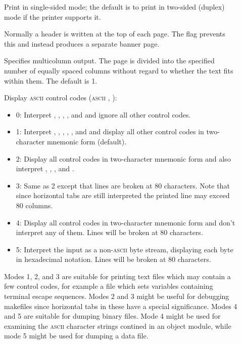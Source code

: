 \begin{description}
\item[]
   Print in single-sided mode; the default is to print in two-sided (duplex)
   mode if the printer supports it.

\item[]
   Normally a header is written at the top of each page.  The  flag
   prevents this and instead produces a separate banner page.

\item[\code{\#}]
   Specifies multicolumn output.  The page is divided into the specified
   number of equally spaced columns without regard to whether the text fits
   within them.  The default is 1.

\item[\code{\#}]
   Display \textsc{ascii} control codes (\textsc{ascii} ,
   ):

   \begin{itemize}
   \item
      0: Interpret , , , , and 
      and ignore all other control codes.

   \item
      1: Interpret , , , , , and
       and display all other control codes in two-character mnemonic
      form (default).

   \item
      2: Display all control codes in two-character mnemonic form and also
      interpret , , , and .

   \item
      3: Same as 2 except that lines are broken at 80 characters.  Note that
      since horizontal tabs are still interpreted the printed line may exceed
      80 columns.

   \item
      4: Display all control codes in two-character mnemonic form and don't
      interpret any of them.  Lines will be broken at 80 characters.

   \item
      5: Interpret the input as a non-\textsc{ascii} byte stream, displaying
      each byte in hexadecimal notation.  Lines will be broken at 80
      characters.
   \end{itemize}

   Modes 1, 2, and 3 are suitable for printing text files which may contain a
   few control codes, for example a  file which sets variables
   containing terminal escape sequences.  Modes 2 and 3 might be useful for
   debugging makefiles since horizontal tabs in these have a special
   significance.  Modes 4 and 5 are suitable for dumping binary files.   Mode
   4 might be used for examining the \textsc{ascii} character strings contined
   in an object module, while mode 5 might be used for dumping a data file.


\end{description}
